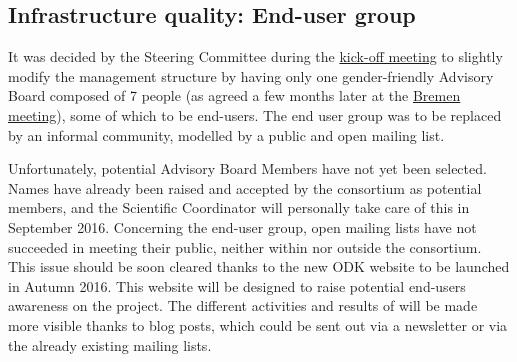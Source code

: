 \documentclass{deliverablereport}
\begin{document}
\subsection{Infrastructure quality: End-user group}


It was decided by the Steering Committee during the
\href{http://opendreamkit.org/meetings/2015-09-02-Kickoff/management_structure/}{kick-off
  meeting} to slightly modify the management structure by having only
one gender-friendly Advisory Board composed of 7 people (as agreed a
few months later at the
\href{http://opendreamkit.org/meetings/2016-06-27-Bremen/minutes/}{Bremen
  meeting}), some of which to be end-users.  The end user group was to
be replaced by an informal community, modelled by a public and open
mailing list.

Unfortunately, potential Advisory Board Members have not yet been
selected. Names have already been raised and accepted by the
consortium as potential members, and the Scientific Coordinator will
personally take care of this in September 2016. Concerning the
end-user group, open mailing lists have not succeeded in meeting their
public, neither within \ODK nor outside the consortium.  This issue
should be soon cleared thanks to the new ODK website to be launched in
Autumn 2016. This website will be designed to raise potential
end-users awareness on the project. The different activities and
results of \ODK will be made more visible thanks to blog posts, which
could be sent out via a newsletter or via the already existing mailing
lists.



\printbibliography
\end{document}
